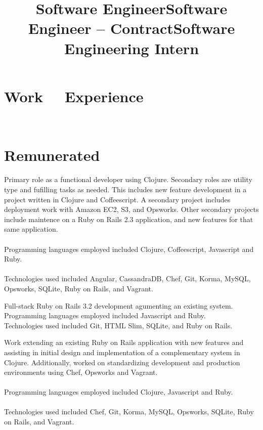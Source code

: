 \documentclass[margintitle,line]{res}
\renewcommand{\subsection}[1]{\section{\normalfont #1}}
\begin{document}
\begin{resume}

\section{Work \ \ Experience}
\ \\
\subsection{Remunerated}

\title{Software Engineer}
\begin{position}
 Primary role as a functional developer using Clojure. Secondary roles are utility type and fufilling tasks as needed. This includes new feature development in a project written in Clojure and Coffeescript. A secondary project includes deployment work with Amazon EC2, S3, and Opsworks. Other secondary projects include maintence on a Ruby on Rails 2.3 application, and new features for that same application. \\ \ \\
 Programming languages employed included Clojure, Coffeescript, Javascript and Ruby. \\ \ \\
 Technologies used included Angular, CassandraDB, Chef, Git, Korma, MySQL, Opsworks, SQLite, Ruby on Rails, and Vagrant.
\end{position}

\title{Software Engineer -- Contract}
\begin{position}
 Full-stack Ruby on Rails 3.2 development agumenting an existing system. \\
 Programming languages employed included Javascript and Ruby. \\
 Technologies used included Git, HTML Slim, SQLite, and Ruby on Rails.
\end{position}

\title{Software Engineering Intern}
\begin{position}
 Work extending an existing Ruby on Rails application with new features and assisting in initial design and implementation of a complementary system in  Clojure. Additionally, worked on standardizing development and production environments using Chef, Opsworks and Vagrant. \\ \ \\
 Programming languages employed included Clojure, Javascript and Ruby. \\ \ \\
 Technologies used included Chef, Git, Korma, MySQL, Opsworks, SQLite, Ruby on Rails, and Vagrant.
\end{position}


\end{resume}
\end{document}
